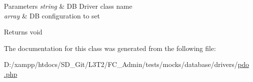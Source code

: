 \begin{DoxyParams}{Parameters}
{\em string} & D\+B Driver class name \\
\hline
{\em array} & D\+B configuration to set \\
\hline
\end{DoxyParams}
\begin{DoxyReturn}{Returns}
void 
\end{DoxyReturn}


The documentation for this class was generated from the following file\+:\begin{DoxyCompactItemize}
\item 
D\+:/xampp/htdocs/\+S\+D\+\_\+\+Git/\+L3\+T2/\+F\+C\+\_\+\+Admin/tests/mocks/database/drivers/\hyperlink{pdo_8php}{pdo.\+php}\end{DoxyCompactItemize}
